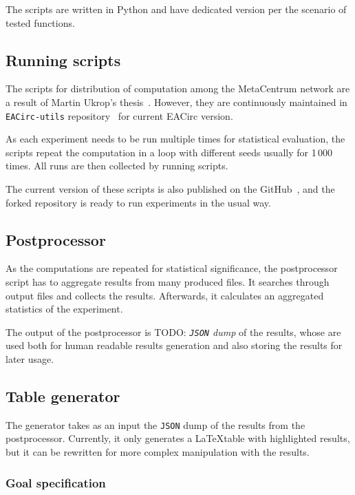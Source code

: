 \documentclass[
  print, %
  Table,   %
  nolof,     %
  nolot,     %
  11pt, %
  oneside  %
]{fithesis3}
\newcommand{\todo}[1]{TODO: \textit{#1}}
\begin{document}
The scripts are written in Python and have dedicated version per the scenario of tested functions.

\subsection{Running scripts}

The scripts for distribution of computation among the MetaCentrum network are a result of Martin Ukrop's thesis~\cite{ukropMgrThesis}. However, they are continuously maintained in \texttt{EACirc-utils} repository~\cite{eaUtils} for current EACirc version.

As each experiment needs to be run multiple times for statistical evaluation, the scripts repeat the computation in a loop with different seeds usually for 1\,000 times. All runs are then collected by running scripts.

The current version of these scripts is also published on the GitHub~\cite{eaUtils}, and the forked repository is ready to run experiments in the usual way.

\subsection{Postprocessor}

As the computations are repeated for statistical significance, the postprocessor script has to aggregate results from many produced files. It searches through output files and collects the results. Afterwards, it calculates an aggregated statistics of the experiment.

The output of the postprocessor is \todo{\texttt{JSON} dump} of the results, whose are used both for human readable results generation and also storing the results for later usage.

\subsection{Table generator}

The generator takes as an input the \texttt{JSON} dump of the results from the postprocessor. Currently, it only generates a \LaTeX table with highlighted results, but it can be rewritten for more complex manipulation with the results.

\subsubsection{Goal specification}
\end{document}
